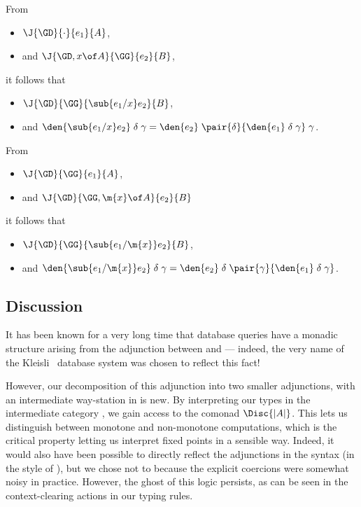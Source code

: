 \begin{theorem}
  From
  \begin{itemize}
  \item $\J{\GD}{\cdot}{e_1}{A}$,
  \item and $\J{\GD,x \of A}{\GG}{e_2}{B}$,
  \end{itemize}
  it follows that
  \begin{itemize}
  \item $\J{\GD}{\GG}{\sub{e_1/x}e_2}{B}$,
  \item and $\den{\sub{e_1/x} e_2} \dg = \den{e_2} \;\pair{\delta}{\den{e_1}\dg}
    \;\gamma$.
  \end{itemize}
\end{theorem}

\begin{theorem}
  From
  \begin{itemize}
  \item $\J{\GD}{\GG}{e_1}{A}$,
  \item and $\J{\GD}{\GG,\m{x}\of A}{e_2}{B}$
  \end{itemize}
  it follows that
  \begin{itemize}
  \item $\J{\GD}{\GG}{\sub{e_1/\m{x}}e_2}{B}$,
  \item and $\den{\sub{e_1/\m{x}} e_2} \dg = \den{e_2} \;\delta
    \;\pair{\gamma}{\den{e_1} \dg}$.
  \end{itemize}
\end{theorem}

\subsection{Discussion}
It has been known for a very long time that database queries have a monadic
structure arising from the adjunction between \cSet{} and \cSL{} --- indeed, the
very name of the Kleisli~\cite{kleisli} database system was chosen to reflect
this fact!

However, our decomposition of this adjunction into two smaller adjunctions, with
an intermediate way-station in \cPoset{} is new. By interpreting our types in
the intermediate category \cPoset{}, we gain access to the comonad $\Disc{|A|}$.
This lets us distinguish between monotone and non-monotone computations, which
is the critical property letting us interpret fixed points in a sensible way.
Indeed, it would also have been possible to directly reflect the adjunctions in
the syntax (in the style of \citet{lnl}), but we chose not to because the
explicit coercions were somewhat noisy in practice. However, the ghost of this
logic persists, as can be seen in the context-clearing actions in our typing
rules.


